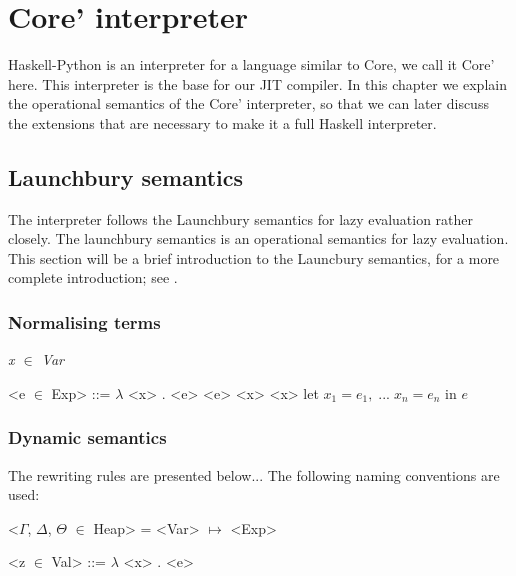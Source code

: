 
\chapter{Core' interpreter}

Haskell-Python is an interpreter for a language similar to Core, we call it Core' here.
This interpreter is the base for our JIT compiler. In this chapter we explain the 
operational semantics of the Core' interpreter, so that we can later discuss the 
extensions that are necessary to make it a full Haskell interpreter.

\section*{Launchbury semantics}

The interpreter follows the Launchbury semantics for lazy evaluation rather closely.
The launchbury semantics is an operational semantics for lazy evaluation. This section
will be a brief introduction to the Launcbury semantics, for a more complete introduction;
see \cite{launchbury1993natural}. 

\subsection*{Normalising terms}

\normalfont\itshape 
x $\in$ Var 
\normalfont
\begin{grammar}
 <e $\in$ Exp> ::= $\lambda$ <x> . <e>
              \alt <e> <x>
              \alt <x>
              \alt let $x_1 = e_1, \; ... \; x_n = e_n$ in $e$
\end{grammar}


\subsection*{Dynamic semantics}

The rewriting rules are presented below... The following naming conventions
are used:

\begin{grammar}
<$\Gamma$, $\Delta$, $\Theta$ $\in$ Heap> = <Var> $\mapsto$ <Exp>

<z $\in$ Val> ::= $\lambda$ <x> . <e>
\end{grammar}

